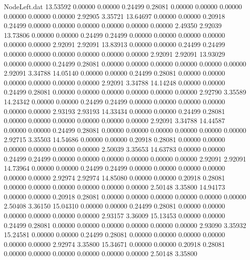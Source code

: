 \begin{filecontents}{NodeLeft.dat}
  13.53592    0.00000    0.00000     0.24499    0.28081    0.00000    0.00000    0.00000    0.00000    0.00000    0.00000    2.92905    3.35721
  13.64697    0.00000    0.00000     0.20918    0.24499    0.00000    0.00000    0.00000    0.00000    0.00000    0.00000    2.49350    2.92039
  13.73806    0.00000    0.00000     0.24499    0.24499    0.00000    0.00000    0.00000    0.00000    0.00000    0.00000    2.92091    2.92091
  13.83913    0.00000    0.00000     0.24499    0.24499    0.00000    0.00000    0.00000    0.00000    0.00000    0.00000    2.92091    2.92091
  13.93029    0.00000    0.00000     0.24499    0.28081    0.00000    0.00000    0.00000    0.00000    0.00000    0.00000    2.92091    3.34788
  14.05140    0.00000    0.00000     0.24499    0.28081    0.00000    0.00000    0.00000    0.00000    0.00000    0.00000    2.92091    3.34788
  14.14248    0.00000    0.00000     0.24499    0.28081    0.00000    0.00000    0.00000    0.00000    0.00000    0.00000    2.92790    3.35589
  14.24342    0.00000    0.00000     0.24499    0.24499    0.00000    0.00000    0.00000    0.00000    0.00000    0.00000    2.93193    2.93193
  14.33434    0.00000    0.00000     0.24499    0.28081    0.00000    0.00000    0.00000    0.00000    0.00000    0.00000    2.92091    3.34788
  14.44587    0.00000    0.00000     0.24499    0.28081    0.00000    0.00000    0.00000    0.00000    0.00000    0.00000    2.92715    3.35503
  14.54686    0.00000    0.00000     0.20918    0.28081    0.00000    0.00000    0.00000    0.00000    0.00000    0.00000    2.50039    3.35653
  14.63783    0.00000    0.00000     0.24499    0.24499    0.00000    0.00000    0.00000    0.00000    0.00000    0.00000    2.92091    2.92091
  14.73964    0.00000    0.00000     0.24499    0.24499    0.00000    0.00000    0.00000    0.00000    0.00000    0.00000    2.92974    2.92974
  14.85080    0.00000    0.00000     0.20918    0.28081    0.00000    0.00000    0.00000    0.00000    0.00000    0.00000    2.50148    3.35800
  14.94173    0.00000    0.00000     0.20918    0.28081    0.00000    0.00000    0.00000    0.00000    0.00000    0.00000    2.50408    3.36150
  15.04310    0.00000    0.00000     0.24499    0.28081    0.00000    0.00000    0.00000    0.00000    0.00000    0.00000    2.93157    3.36009
  15.13453    0.00000    0.00000     0.24499    0.28081    0.00000    0.00000    0.00000    0.00000    0.00000    0.00000    2.93090    3.35932
  15.24581    0.00000    0.00000     0.24499    0.28081    0.00000    0.00000    0.00000    0.00000    0.00000    0.00000    2.92974    3.35800
  15.34671    0.00000    0.00000     0.20918    0.28081    0.00000    0.00000    0.00000    0.00000    0.00000    0.00000    2.50148    3.35800

\end{filecontents}
